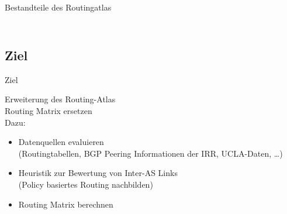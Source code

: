 \documentclass[ngerman,compress,hyperref={bookmarks}]{beamer}
\begin{document}
\begin{frame}[allowframebreaks]{Bestandteile des Routingatlas}
\begin{columns}[c]
\begin{column}{0.5\textwidth}
\begin{figure}
      \end{figure}
    \end{column}
  \end{columns}
\end{frame}



\subsection{Ziel}
\begin{frame}{Ziel}
  \begin{center}
    {\Large Erweiterung des Routing-Atlas}\\
    \vspace{0.5cm}
    Routing Matrix ersetzen\\
    \vspace{0.5cm}
    Dazu:
    \begin{itemize}
      \item Datenquellen evaluieren\\{\scriptsize(Routingtabellen, BGP Peering Informationen der IRR, UCLA-Daten, \ldots)}
      \item Heuristik zur Bewertung von Inter-AS Links\\{\scriptsize(Policy basiertes Routing nachbilden)}
      \item Routing Matrix berechnen
    \end{itemize}
  \end{center}
\end{frame}

\end{document}
